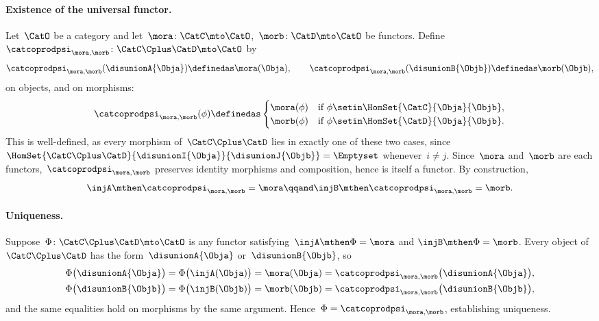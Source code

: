 {\begin{example}
        \paragraph{Existence of the universal functor.}
        Let~$\CatO$ be a category and let~$\mora \colon \CatC \mto \CatO$,~$\morb \colon \CatD \mto \CatO$ be functors.
        Define~$\catcoprodpsi_{\mora,\morb} \colon \CatC \Cplus \CatD \mto \CatO$ by
        \begin{equation}
            \catcoprodpsi_{\mora,\morb}(\disunionA{\Obja}) \definedas \mora(\Obja),
            \qquad
            \catcoprodpsi_{\mora,\morb}(\disunionB{\Objb}) \definedas \morb(\Objb),
        \end{equation}
        on objects, and on morphisms:
        \begin{equation}
            \catcoprodpsi_{\mora,\morb}(\phi) \definedas
            \begin{cases}
                \mora(\phi) & \text{if } \phi \setin \HomSet{\CatC}{\Obja}{\Objb}, \\
                \morb(\phi) & \text{if } \phi \setin \HomSet{\CatD}{\Obja}{\Objb}.
            \end{cases}
        \end{equation}
        This is well-defined, as every morphism of~$\CatC \Cplus \CatD$ lies in exactly one of these two cases, since~$\HomSet{\CatC \Cplus \CatD}{\disunionI{\Obja}}{\disunionJ{\Objb}} = \Emptyset$ whenever~$i \neq j$.
        Since~$\mora$ and~$\morb$ are each functors,~$\catcoprodpsi_{\mora,\morb}$ preserves identity morphisms and composition, hence is itself a functor.
        By construction,
        \begin{equation}
            \injA \mthen \catcoprodpsi_{\mora,\morb} = \mora
            \qqand
            \injB \mthen \catcoprodpsi_{\mora,\morb} = \morb.
        \end{equation}

        \paragraph{Uniqueness.}
        Suppose~$\Phi \colon \CatC \Cplus \CatD \mto \CatO$ is any functor satisfying~$\injA \mthen \Phi = \mora$ and $\injB \mthen \Phi = \morb$.
        Every object of~$\CatC \Cplus \CatD$ has the form~$\disunionA{\Obja}$ or~$\disunionB{\Objb}$, so
        \begin{align}
            \Phi\bigl(\disunionA{\Obja}\bigr)
             & = \Phi\bigl(\injA(\Obja)\bigr)
            = \mora(\Obja)
            = \catcoprodpsi_{\mora,\morb}\bigl(\disunionA{\Obja}\bigr), \\
            \Phi\bigl(\disunionB{\Objb}\bigr)
             & = \Phi\bigl(\injB(\Objb)\bigr)
            = \morb(\Objb)
            = \catcoprodpsi_{\mora,\morb}\bigl(\disunionB{\Objb}\bigr),
        \end{align}
        and the same equalities hold on morphisms by the same argument.
        Hence~$\Phi = \catcoprodpsi_{\mora,\morb}$, establishing uniqueness.
    \end{example}}